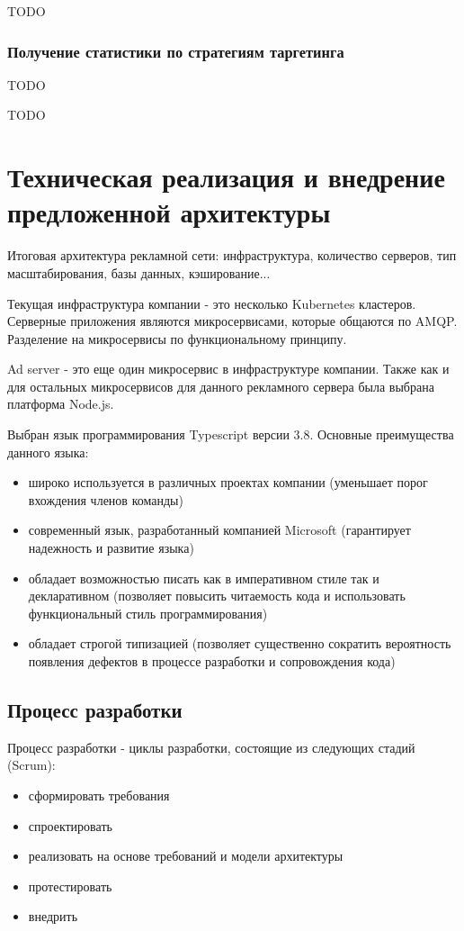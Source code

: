 \documentclass[times]{itmo-student-thesis}
\begin{document}
TODO

\subsection{Получение статистики по стратегиям таргетинга}

TODO

\chapterconclusion

TODO






\chapter{Техническая реализация и внедрение предложенной архитектуры}

Итоговая архитектура рекламной сети: инфраструктура, количество серверов, тип масштабирования, базы данных, кэширование...

Текущая инфраструктура компании - это несколько Kubernetes кластеров. Серверные приложения являются микросервисами, которые общаются по AMQP. Разделение на микросервисы по функциональному принципу. 

Ad server - это еще один микросервис в инфраструктуре компании. Также как и для остальных микросервисов для данного рекламного сервера была выбрана платформа Node.js.

Выбран язык программирования Typescript \cite{typescript-lang} версии 3.8. Основные преимущества данного языка:
\begin{itemize}
\item широко используется в различных проектах компании (уменьшает порог вхождения членов команды)
\item современный язык, разработанный компанией Microsoft (гарантирует надежность и развитие языка)
\item обладает возможностью писать как в императивном стиле так и декларативном (позволяет повысить читаемость кода и использовать функциональный стиль программирования)
\item обладает строгой типизацией (позволяет существенно сократить вероятность появления дефектов в процессе разработки и сопровождения кода)
\end{itemize}

\section{Процесс разработки}

Процесс разработки - циклы разработки, состоящие из следующих стадий (Scrum):
\begin{itemize}
	\item сформировать требования
	\item спроектировать
	\item реализовать на основе требований и модели архитектуры
	\item протестировать
	\item внедрить
\end{itemize}
\end{document}
